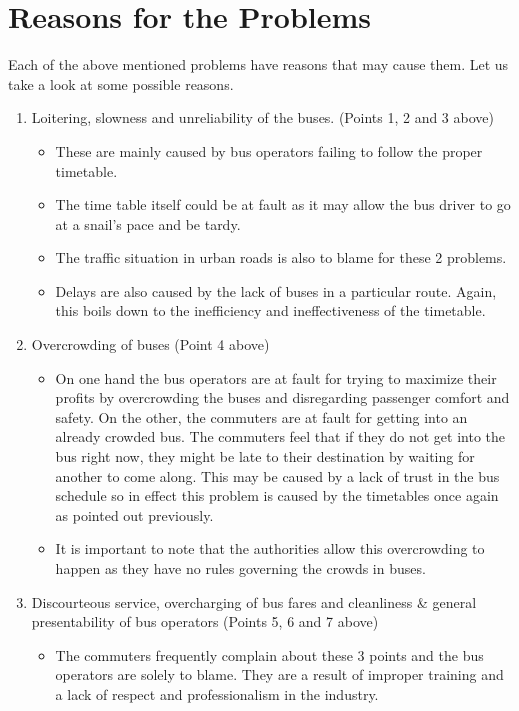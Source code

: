 
\section{Reasons for the Problems}
Each of the above mentioned problems have reasons that may cause them. Let us take a look at some possible reasons.
\begin {enumerate}
\item Loitering, slowness and unreliability of the buses. (Points 1, 2 and 3 above)
\begin {itemize}
\item These are mainly caused by bus operators failing to follow the proper timetable.
\item The time table itself could be at fault as it may allow the bus driver to go at a snail's pace and be tardy.
\item The traffic situation in urban roads is also to blame for these 2 problems.
\item Delays are also caused by the lack of buses in a particular route. Again, this boils down to the inefficiency and ineffectiveness of the timetable.
\end {itemize}
\item Overcrowding of buses (Point 4 above)
\begin {itemize}
\item On one hand the bus operators are at fault for trying to maximize their profits by overcrowding the buses and disregarding passenger comfort and safety. On the other, the commuters are at fault for getting into an already crowded bus. The commuters feel that if they do not get into the bus right now, they might be late to their destination by waiting for another to come along. This may be caused by a lack of trust in the bus schedule so in effect this problem is caused by the timetables once again as pointed out previously.
\item It is important to note that the authorities allow this overcrowding to happen as they have no rules governing the crowds in buses.
\end {itemize}
\item Discourteous service, overcharging of bus fares and cleanliness \& general presentability of bus operators (Points 5, 6 and 7 above)
\begin {itemize}
\item The commuters frequently complain about these 3 points and the bus operators are solely to blame. They are a result of improper training and a lack of respect and professionalism in the industry.

\end{itemize}
\end{enumerate}

